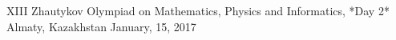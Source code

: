 \documentclass [11pt, a4paper, oneside] {article}
\begin{document}
\contest
{XIII Zhautykov Olympiad on Mathematics, Physics and Informatics, *Day 2*}%
{Almaty, Kazakhstan}%
{January, 15, 2017}%


\renewcommand{\t}{\texttt}
\end{document}
